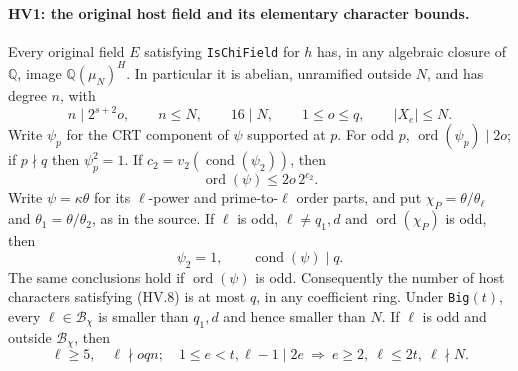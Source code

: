 \paragraph{HV1: the original host field and its elementary character bounds.}
\label{claim:HV1}
Every original field $E$ satisfying \texttt{IsChiField} for $h$
has, in any algebraic closure of $\mathbb Q$, image
$\mathbb Q(\mu_N)^H$.  In particular it is abelian,
unramified outside $N$, and has degree $n$, with
\[
 n\mid2^{s+2}o,\qquad n\le N,\qquad16\mid N,\qquad
 1\le o\le q,\qquad |X_e|\le N.
 \tag{HV.6}
\]
Write $\psi_p$ for the CRT component of $\psi$ supported at $p$.
For odd $p$, $\operatorname{ord}(\psi_p)\mid2o$; if $p\nmid q$
then $\psi_p^2=1$.  If
$c_2=v_2(\operatorname{cond}(\psi_2))$, then
\[
                   \operatorname{ord}(\psi)\le2o\,2^{c_2}.
 \tag{HV.7}
\]
Write $\psi=\kappa\theta$ for its $\ell$-power and prime-to-$\ell$
order parts, and put
$\chi_P=\theta/\theta_\ell$ and $\theta_1=\theta/\theta_2$,
as in the source.  If $\ell$ is odd, $\ell\ne q_1,d$ and
$\operatorname{ord}(\chi_P)$ is odd, then
\[
          \psi_2=1,\qquad\operatorname{cond}(\psi)\mid q.
 \tag{HV.8}
\]
The same conclusions hold if $\operatorname{ord}(\psi)$ is odd.
Consequently the number of host characters satisfying (HV.8)
is at most $q$, in any coefficient ring.
Under \texttt{Big}$(t)$, every $\ell\in\mathcal B_\chi$ is
smaller than $q_1,d$ and hence smaller than $N$.  If $\ell$ is
odd and outside $\mathcal B_\chi$, then
\[
 \ell\ge5,\quad\ell\nmid oqn;
 \quad 1\le e<t, \ell-1\mid2e
       \ \Longrightarrow\ e\ge2,\ \ell\le2t,\ \ell\nmid N.
 \tag{HV.9}
\]

